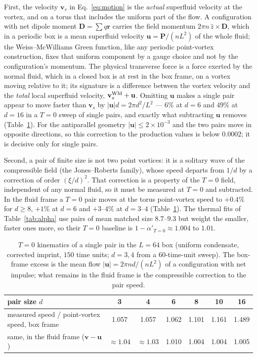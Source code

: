 \documentclass[11pt,a4paper]{article}
\begin{document}
First, the velocity $\mathbf v_s$ in Eq.~\eqref{eq:motion} is the \emph{actual} superfluid velocity at the vortex,
and on a torus that includes the uniform part of the flow. A configuration with net dipole moment $\mathbf D=\sum q\mathbf r$
carries the field momentum $2\pi n\,\hat z\times\mathbf D$, which in a periodic box is a mean superfluid velocity
$\mathbf u=\mathbf P/(nL^2)$ of the whole fluid; the Weiss--McWilliams Green function, like any periodic point-vortex
construction, fixes that uniform component by a gauge choice and not by the configuration's momentum. The physical
transverse force is a force exerted by the normal fluid, which in a closed box is at rest in the box frame, on a
vortex moving relative to it; its signature is a difference between the vortex velocity and the \emph{total} local
superfluid velocity, $\mathbf v_s^{\rm WM}+\mathbf u$. Omitting $\mathbf u$ makes a single pair appear to move faster
than $\mathbf v_s$ by $|\mathbf u|d=2\pi d^2/L^2$ --- $6\%$ at $d=6$ and $49\%$ at $d=16$ in a $T=0$ sweep of single
pairs, and exactly what subtracting $\mathbf u$ removes (Table~\ref{tab:T0}). For the antiparallel geometry
$|\mathbf u|\le2\times10^{-3}$ and the two pairs move in opposite directions, so this correction to the production
values is below $0.0002$; it is decisive only for single pairs.

Second, a pair of finite size is not two point vortices: it is a solitary wave of the compressible field (the
Jones--Roberts family), whose speed departs from $1/d$ by a correction of order $(\xi/d)^2$. That correction is a
property of the $T=0$ field, independent of any normal fluid, so it must be measured at $T=0$ and subtracted. In the
fluid frame a $T=0$ pair moves at the torus point-vortex speed to $+0.4\%$ for $d\ge8$, $+1\%$ at $d=6$ and
$+3$--$4\%$ at $d=3$--$4$ (Table~\ref{tab:T0}). The thermal fits of Table~\ref{tab:alpha} use pairs of mean matched
size $8.7$--$9.3$ but weight the smaller, faster ones more, so their $T=0$ baseline is $1-\alpha'_{T=0}\approx1.004$
to $1.01$.

\begin{table}[t]\centering\small
\begin{tabular}{lcccccc}
\toprule
pair size $d$ & 3 & 4 & 6 & 8 & 10 & 16\\
\midrule
measured speed / point-vortex speed, box frame & 1.057 & 1.057 & 1.062 & 1.101 & 1.161 & 1.489\\
same, in the fluid frame ($\mathbf v-\mathbf u$) & $\approx1.04$ & $\approx1.03$ & 1.010 & 1.004 & 1.004 & 1.005\\
\bottomrule
\end{tabular}
\caption{$T=0$ kinematics of a single pair in the $L=64$ box (uniform condensate, corrected imprint, $150$ time
units; $d=3,4$ from a $60$-time-unit sweep). The box-frame excess is the mean flow $|\mathbf u|=2\pi nd/(nL^2)$ of a
configuration with net impulse; what remains in the fluid frame is the compressible correction to the pair speed.}
\label{tab:T0}
\end{table}
\end{document}
